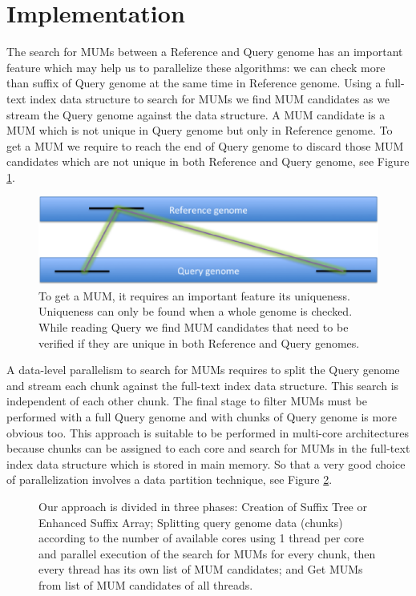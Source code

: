 \documentclass{acm_proc_article-sp}
\begin{document}
\section{Implementation}
The search for MUMs between a Reference and Query genome has an important feature which may help us to parallelize these algorithms: we can check more than suffix of Query genome at the same time in  Reference genome. Using a full-text index data structure to search for MUMs we find MUM candidates as we stream the Query genome against the data structure. A MUM candidate is a MUM which is not unique in Query genome but only in Reference genome. To get a MUM we require to reach the end of Query genome to discard those MUM candidates which are not unique in both Reference and Query genome, see Figure \ref{Whole-MUM}.\\ 
\begin{figure}[h]
\centering 
  \includegraphics[scale=0.4]{Whole-MUM.eps}
\caption{To get a MUM, it requires an important feature its uniqueness. Uniqueness can only be found when a whole genome is checked. While reading Query we find MUM candidates that need to be verified if they are unique in both Reference and Query genomes.} 
\label{Whole-MUM} 
\end{figure}
A data-level parallelism to search for MUMs requires to split the Query genome and stream each chunk against the full-text index data structure. This search is independent of each other chunk. The final stage to filter MUMs must be performed with a full Query genome and with chunks of Query genome is more obvious too. This approach is suitable to be performed in multi-core architectures because chunks can be assigned to each core and search for MUMs in the full-text index data structure which is stored in main memory. So that a very good choice of parallelization involves a data partition technique, see Figure \ref{phases}.\\
\begin{figure}[h] 
\centering 
\caption{Our approach is divided in three phases: Creation of Suffix Tree or Enhanced Suffix Array; Splitting query genome data (chunks) according to the number of available cores using 1 thread per core and parallel execution of the search for MUMs for every chunk, then every thread has its own list of MUM candidates; and Get MUMs from list of MUM candidates of all threads.}
  \label{phases}
\end{figure}
\end{document}
